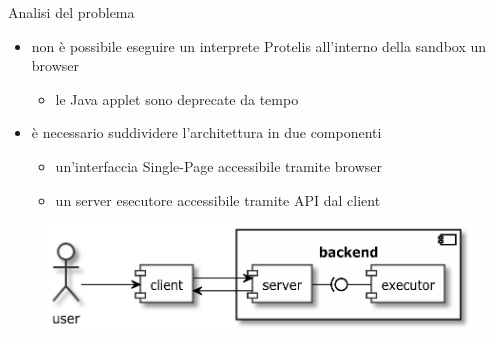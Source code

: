     \begin{frame}{\insertsectionhead}{\insertsubsectionhead}

      \begin{block}{Analisi del problema}
        \begin{itemize}
          \item
            non è possibile eseguire un interprete Protelis all'interno della sandbox un browser
            \begin{itemize}
              \item le Java applet sono deprecate da tempo
            \end{itemize}
          \item
            è necessario suddividere l'architettura in due componenti
            \begin{itemize}
              \item un'interfaccia Single-Page accessibile tramite browser
              \item un server esecutore accessibile tramite API dal client
            \end{itemize}
        \end{itemize}
      \end{block}

      \begin{figure}
        \includegraphics[width=.63\textwidth]{res/uml/architecture-design-fix.eps}
      \end{figure}

    \end{frame}
